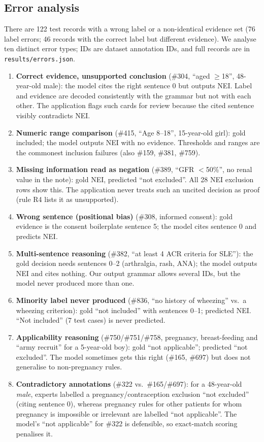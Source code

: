\subsection{Error analysis}
There are 122 test records with a wrong label or a non-identical evidence set (76 label errors; 46 records with the correct label but different evidence). We analyse ten distinct error types; IDs are dataset annotation IDs, and full records are in \texttt{results/errors.json}.
\begin{enumerate}
\item \textbf{Correct evidence, unsupported conclusion} (\#304, ``aged $\geq$18'', 48-year-old male): the model cites the right sentence 0 but outputs NEI. Label and evidence are decoded consistently with the grammar but not with each other. The application flags such cards for review because the cited sentence visibly contradicts NEI.
\item \textbf{Numeric range comparison} (\#415, ``Age 8--18'', 15-year-old girl): gold included; the model outputs NEI with no evidence. Thresholds and ranges are the commonest inclusion failures (also \#159, \#381, \#759).
\item \textbf{Missing information read as negation} (\#389, ``GFR $<$50\%'', no renal value in the note): gold NEI, predicted ``not excluded''. All 28 NEI exclusion rows show this. The application never treats such an uncited decision as proof (rule R4 lists it as unsupported).
\item \textbf{Wrong sentence (positional bias)} (\#308, informed consent): gold evidence is the consent boilerplate sentence 5; the model cites sentence 0 and predicts NEI.
\item \textbf{Multi-sentence reasoning} (\#382, ``at least 4 ACR criteria for SLE''): the gold decision needs sentences 0--2 (arthralgia, rash, ANA); the model outputs NEI and cites nothing. Our output grammar allows several IDs, but the model never produced more than one.
\item \textbf{Minority label never produced} (\#836, ``no history of wheezing'' vs.\ a wheezing criterion): gold ``not included'' with sentences 0--1; predicted NEI. ``Not included'' (7 test cases) is never predicted.
\item \textbf{Applicability reasoning} (\#750/\#751/\#758, pregnancy, breast-feeding and ``army recruit'' for a 5-year-old boy): gold ``not applicable''; predicted ``not excluded''. The model sometimes gets this right (\#165, \#697) but does not generalise to non-pregnancy rules.
\item \textbf{Contradictory annotations} (\#322 vs.\ \#165/\#697): for a 48-year-old \emph{male}, experts labelled a pregnancy/contraception exclusion ``not excluded'' (citing sentence 0), whereas pregnancy rules for other patients for whom pregnancy is impossible or irrelevant are labelled ``not applicable''. The model's ``not applicable'' for \#322 is defensible, so exact-match scoring penalises it.

\end{enumerate}
